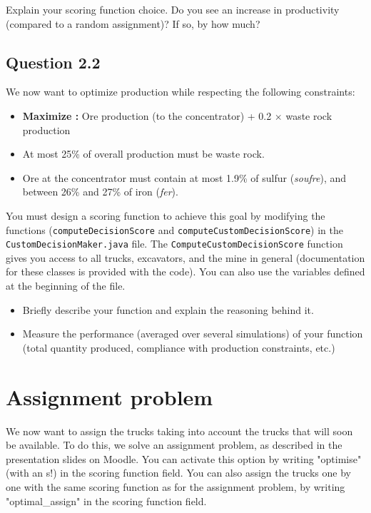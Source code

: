\documentclass[letterpaper,12pt]{article}
\begin{document}
	
	Explain your scoring function choice. Do you see an increase in productivity (compared to a random assignment)? If so, by how much?

	\subsection*{Question 2.2}
	
	
	We now want to optimize production while respecting the following constraints:
	
	\begin{itemize}
		\item \textbf{Maximize : }  Ore production (to the concentrator) + 0.2 $\times$ waste rock production
		\item At most 25\% of overall production must be waste rock.
		\item Ore at the concentrator must contain at most 1.9\% of sulfur (\textit{soufre}), and between 26\% and 27\% of iron (\textit{fer}).
	\end{itemize}
	
	You must design a scoring function to achieve this goal by modifying the functions (\verb|computeDecisionScore| and \verb|computeCustomDecisionScore|) in the \verb|CustomDecisionMaker.java| file. The \verb!ComputeCustomDecisionScore! function gives you access to all trucks, excavators, and the mine in general (documentation for these classes is provided with the code). You can also use the variables defined at the beginning of the file.
	
	
	\begin{itemize}
		\item Briefly describe your function and explain the reasoning behind it.
		\item Measure the performance (averaged over several simulations) of your function (total quantity produced, compliance with production constraints, etc.)
	\end{itemize}
	
	
	
	\section{Assignment problem}
	
	We now want to assign the trucks taking into account the trucks that will soon be available. To do this, we solve an assignment problem, as described in the presentation slides on Moodle. You can activate this option by writing "optimise" (with an s!) in the scoring function field. You can also assign the trucks one by one with the same scoring function as for the assignment problem, by writing "optimal\_assign" in the scoring function field.
	
\end{document}
